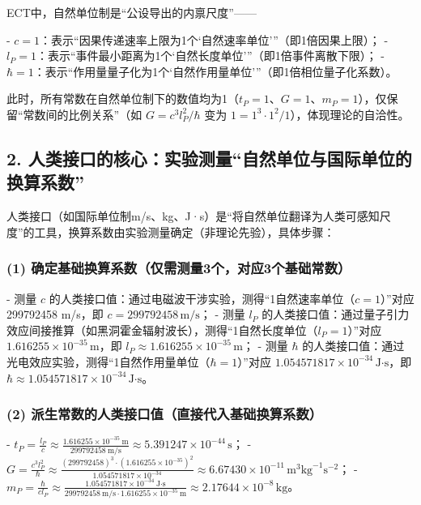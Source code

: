 \documentclass{article}
\begin{document}
ECT中，自然单位制是“公设导出的内禀尺度”——

- \( c=1 \)：表示“因果传递速率上限为1个‘自然速率单位’”（即1倍因果上限）；
- \( l_P=1 \)：表示“事件最小距离为1个‘自然长度单位’”（即1倍事件离散下限）；
- \( \hbar=1 \)：表示“作用量量子化为1个‘自然作用量单位’”（即1倍相位量子化系数）。

此时，所有常数在自然单位制下的数值均为1（\( t_P=1 \)、\( G=1 \)、\( m_P=1 \)），仅保留“常数间的比例关系”（如 \( G = c^3 l_P^2/\hbar \) 变为 \( 1=1^3 \cdot 1^2 /1 \)），体现理论的自洽性。

\subsection*{2. 人类接口的核心：实验测量“自然单位与国际单位的换算系数”}

人类接口（如国际单位制m/s、kg、J·s）是“将自然单位翻译为人类可感知尺度”的工具，换算系数由实验测量确定（非理论先验），具体步骤：

\subsubsection*{(1) 确定基础换算系数（仅需测量3个，对应3个基础常数）}

- 测量 \( c \) 的人类接口值：通过电磁波干涉实验，测得“1自然速率单位（\( c=1 \)）”对应 299792458 m/s，即 \( c = 299792458 \, \text{m/s} \)；
- 测量 \( l_P \) 的人类接口值：通过量子引力效应间接推算（如黑洞霍金辐射波长），测得“1自然长度单位（\( l_P=1 \)）”对应 \( 1.616255 \times 10^{-35} \, \text{m} \)，即 \( l_P \approx 1.616255 \times 10^{-35} \, \text{m} \)；
- 测量 \( \hbar \) 的人类接口值：通过光电效应实验，测得“1自然作用量单位（\( \hbar=1 \)）”对应 \( 1.054571817 \times 10^{-34} \, \text{J·s} \)，即 \( \hbar \approx 1.054571817 \times 10^{-34} \, \text{J·s} \)。

\subsubsection*{(2) 派生常数的人类接口值（直接代入基础换算系数）}

- \( t_P = \frac{l_P}{c} \approx \frac{1.616255 \times 10^{-35}\ \text{m}}{299792458\ \text{m/s}} \approx 5.391247 \times 10^{-44} \, \text{s} \)；
- \( G = \frac{c^3 l_P^2}{\hbar} \approx \frac{(299792458)^3 \cdot (1.616255 \times 10^{-35})^2}{1.054571817 \times 10^{-34}} \approx 6.67430 \times 10^{-11} \, \text{m}^3\text{kg}^{-1}\text{s}^{-2} \)；
- \( m_P = \frac{\hbar}{c l_P} \approx \frac{1.054571817 \times 10^{-34}\ \text{J·s}}{299792458\ \text{m/s} \cdot 1.616255 \times 10^{-35}\ \text{m}} \approx 2.17644 \times 10^{-8} \, \text{kg} \)。
\end{document}
